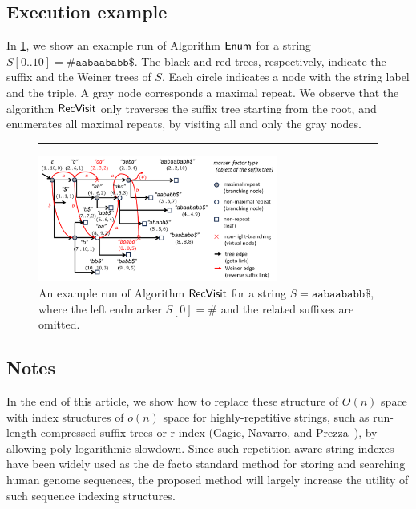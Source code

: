 \documentclass{article}
\begin{document}

\bigskip

\subsection{Execution example}

In \cref{fig:run:example}, we show an example run of Algorithm $\textsf{Enum}$ for a string $S[0..10] = \mathtt{\#aabaababb\$}$. The black and red trees, respectively, indicate the suffix and the Weiner trees of $S$. Each circle indicates a node with the string label and the triple. A gray node corresponds a maximal repeat. 
We observe that the algorithm $\textsf{RecVisit}$ only traverses the suffix tree starting from the root, and enumerates all maximal repeats, by visiting all and only the gray nodes. 

\begin{figure}[t]
  \centering
  \rule{0.09\textwidth}{0em}
\includegraphics[width=0.7\textwidth]{fig2.pdf}
\vspace{.75\baselineskip}
\caption{An example run of Algorithm $\textsf{RecVisit}$ for a string $S = \mathtt{aabaababb\$}$, where the left endmarker $S[0]=\#$ and the related suffixes are omitted. 
}\label{fig:run:example}
\end{figure}

\subsection{Notes} In the end of this article, we show how to replace these structure of $O(n)$ space with index structures of $o(n)$ space for highly-repetitive strings, such as run-length compressed suffix trees or r-index (Gagie, Navarro, and Prezza~\cite{gagie:navarro:prezza2020fully}), by allowing poly-logarithmic slowdown. Since such repetition-aware string indexes have been widely used as the de facto standard method for storing and searching human genome sequences, the proposed method will largely increase the utility of such sequence indexing structures.
\end{document}
